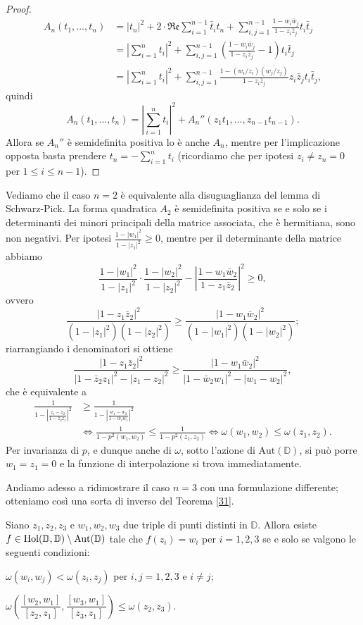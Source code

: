 \begin{proof}
\begin{align*}
    A_n(t_1,\dots,t_n)&=|t_n|^2+2\cdot\mathfrak{Re}\sum_{i=1}^{n-1}\bar{t}_it_n+\sum_{i,j=1}^{n-1}\frac{1-w_i\bar{w}_j}{1-z_i\bar{z}_j}t_i\bar{t}_j \\
    &=\left|\sum_{i=1}^n t_i\right|^2+\sum_{i,j=1}^{n-1}\left(\frac{1-w_i\bar{w}_j}{1-z_i\bar{z}_j}-1\right)t_i\bar{t}_j \\
    &=\left|\sum_{i=1}^n t_i\right|^2+\sum_{i,j=1}^{n-1}\frac{1-(w_i/z_i)\overline{(w_j/z_j)}}{1-z_i\bar{z}_j}z_i\bar{z}_jt_i\bar{t}_j,
  \end{align*}
  quindi
  $$A_n(t_1,\dots,t_n)=\left|\sum_{i=1}^n t_i\right|^2+A_n''(z_1t_1,\dots,z_{n-1}t_{n-1}).$$
  Allora se $A_n''$ è semidefinita positiva lo è anche $A_n$, mentre per l'implicazione opposta basta prendere $\displaystyle t_n=-\sum_{i=1}^n t_i$ (ricordiamo che per ipotesi $z_i\not=z_n=0$ per $1 \le i \le n-1$).
\end{proof}

Vediamo che il caso $n=2$ è equivalente alla disuguaglianza del lemma di Schwarz-Pick. La forma quadratica $A_2$ è semidefinita positiva se e solo se i determinanti dei minori principali della matrice associata, che è hermitiana, sono non negativi. Per ipotesi $\frac{1-|w_1|^2}{1-|z_1|^2} \ge 0$, mentre per il determinante della matrice abbiamo
$$\frac{1-|w_1|^2}{1-|z_1|^2}\cdot\frac{1-|w_2|^2}{1-|z_2|^2}-\left|\frac{1-w_1\bar{w}_2}{1-z_1\bar{z}_2}\right|^2 \ge 0,$$
ovvero
$$\frac{|1-z_1\bar{z}_2|^2}{(1-|z_1|^2)(1-|z_2|^2)} \ge \frac{|1-w_1\bar{w}_2|^2}{(1-|w_1|^2)(1-|w_2|^2)};$$
riarrangiando i denominatori si ottiene
$$\frac{|1-z_1\bar{z}_2|^2}{|1-\bar{z}_2z_1|^2-|z_1-z_2|^2} \ge \frac{|1-w_1\bar{w}_2|^2}{|1-\bar{w}_2w_1|^2-|w_1-w_2|^2},$$
che è equivalente a
\begin{align*}
  \frac{1}{1-\left|\frac{z_1-z_2}{1-\bar{z}_2z_1}\right|^2} & \ge \frac{1}{1-\left|\frac{w_1-w_2}{1-\bar{w}_2w_1}\right|^2} \\
  & \Leftrightarrow \frac{1}{1-p^2(w_1,w_2)} \le \frac{1}{1-p^2(z_1,z_2)} \Leftrightarrow \omega(w_1,w_2) \le \omega(z_1,z_2).
\end{align*}
Per invarianza di $p$, e dunque anche di $\omega$, sotto l'azione di $\text{Aut}(\mathbb{D})$, si può porre $w_1=z_1=0$ e la funzione di interpolazione si trova immediatamente.

Andiamo adesso a ridimostrare il caso $n=3$ con una formulazione differente; otteniamo così una sorta di inverso del Teorema \ref{31}.

\begin{thm}
  Siano $z_1, z_2, z_3$ e $w_1, w_2, w_3$ due triple di punti distinti in $\mathbb{D}$. Allora esiste $f \in \normalfont{\text{Hol}}(\mathbb{D},\mathbb{D}) \setminus \normalfont{\text{Aut}}(\mathbb{D})$ tale che $f(z_i)=w_i$ per $i=1,2,3$ se e solo se valgono le seguenti condizioni:
  \begin{nlist}
    \item $\omega(w_i,w_j)<\omega(z_i,z_j)$ per $i,j=1,2,3$ e $i\not=j$;
    \item $\omega\left(\dfrac{[w_2,w_1]}{[z_2,z_1]},\dfrac{[w_3,w_1]}{[z_3,z_1]}\right) \le \omega(z_2,z_3)$.
  \end{nlist}
\end{thm}

